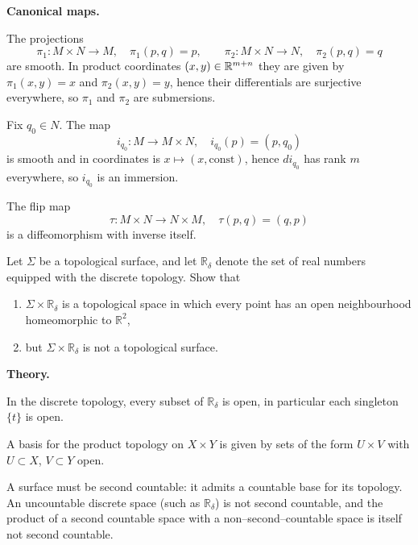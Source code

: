 \begin{solution}
\par\medskip\noindent\textbf{Canonical maps.}\par\smallskip

The projections
\[
\pi_1:M\times N\to M,\quad \pi_1(p,q)=p,\qquad
\pi_2:M\times N\to N,\quad \pi_2(p,q)=q
\]
are smooth. In product coordinates $(x,y)\in\mathbb{R}^{m+n}$ they are given by
$\pi_1(x,y)=x$ and $\pi_2(x,y)=y$, hence their differentials are surjective everywhere,
so $\pi_1$ and $\pi_2$ are submersions.

Fix $q_0\in N$. The map
\[
i_{q_0}:M\to M\times N,\quad i_{q_0}(p)=(p,q_0)
\]
is smooth and in coordinates is $x\mapsto (x,\text{const})$, hence $di_{q_0}$ has rank $m$ everywhere,
so $i_{q_0}$ is an immersion.

The flip map
\[
\tau:M\times N\to N\times M,\quad \tau(p,q)=(q,p)
\]
is a diffeomorphism with inverse itself.


\end{solution}

\begin{problem}
\label{prob:cp-vii-0002}
Let $\Sigma$ be a topological surface, and let $\mathbb{R}_\delta$ denote
the set of real numbers equipped with the discrete topology.
Show that
\begin{enumerate}
	\item $\Sigma\times\mathbb{R}_\delta$ is a topological space in which
	every point has an open neighbourhood homeomorphic to $\mathbb{R}^2$,
	\item but $\Sigma\times\mathbb{R}_\delta$ is not a topological surface.
\end{enumerate}

\par\medskip\noindent\textbf{Theory.}\par\smallskip

In the discrete topology, every subset of $\mathbb{R}_\delta$ is open,
in particular each singleton $\{t\}$ is open.

A basis for the product topology on $X\times Y$ is given by sets of the
form $U\times V$ with $U\subset X$, $V\subset Y$ open.

A surface must be second countable: it admits a countable base for its
topology.  An uncountable discrete space (such as $\mathbb{R}_\delta$)
is not second countable, and the product of a second countable space
with a non--second--countable space is itself not second countable.
\end{problem}

